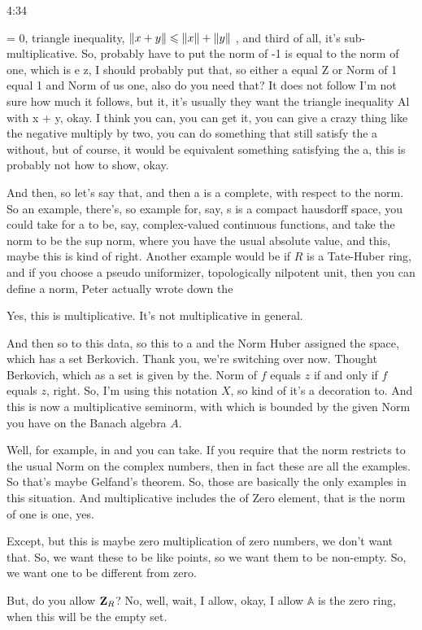 \begin{unfinished}{4:34}
\begin{example}
 = 0, 
triangle inequality, $\left \lVert x + y \right \rVert\leqslant \left \lVert x \right \rVert + \left \lVert y \right \rVert$ , 
and third of all, it's sub-multiplicative. So, probably have to put the norm of -1 is equal to the norm of one, which is e z, I should probably put that, so either a equal Z or Norm of 1 equal 1 and Norm of us one, also do you need that? It does not follow I'm not sure how much it follows, but it, it's usually they want the triangle inequality Al with x + y, okay. I think you can, you can get it, you can give a crazy thing like the negative multiply by two, you can do something that still satisfy the a without, but of course, it would be equivalent something satisfying the a, this is probably not how to show, okay.

And then, so let's say that, and then a is a complete, with respect to the norm. So an example, there's, so example for, say, s is a compact hausdorff space, you could take for a to be, say, complex-valued continuous functions, and take the norm to be the sup norm, where you have the usual absolute value, and this, maybe this is kind of right. Another example would be if $R$ is a Tate-Huber ring, and if you choose a pseudo uniformizer, topologically nilpotent unit, then you can define a norm, Peter actually wrote down the

Yes, this is multiplicative. It's not multiplicative in general.

And then so to this data, so this to a and the Norm Huber assigned the space, which has a set Berkovich. Thank you, we're switching over now. Thought Berkovich, which as a set is given by the. Norm of $f$ equals $z$ if and only if $f$ equals $z$, right.
So, I'm using this notation $X$, so kind of it's a decoration to. And this is now a multiplicative seminorm, with which is bounded by the given Norm you have on the Banach algebra $A$.

Well, for example, in and you can take. If you require that the norm restricts to the usual Norm on the complex numbers, then in fact these are all the examples. So that's maybe Gelfand's theorem. So, those are basically the only examples in this situation. And multiplicative includes the of Zero element, that is the norm of one is one, yes.

Except, but this is maybe zero multiplication of zero numbers, we don't want that. So, we want these to be like points, so we want them to be non-empty. So, we want one to be different from zero.

But, do you allow $\mathbf Z_R$? No, well, wait, I allow, okay, I allow $\mathbb{A}$ is the zero ring, when this will be the empty set.


\end{example}
\end{unfinished}
